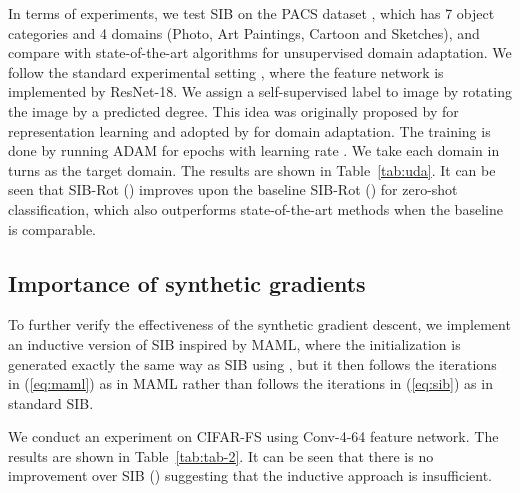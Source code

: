 \documentclass{article} \usepackage{iclr2020_conference,times}
\def\eqref#1{(\ref{#1})}
\begin{document}
In terms of experiments, we test SIB on the PACS dataset \citep{li2017deeper},
which has 7 object categories and 4 domains (Photo, Art Paintings, Cartoon and Sketches),
and compare with state-of-the-art algorithms
for unsupervised domain adaptation. 
We follow the standard experimental setting \citep{carlucci2019domain}, where 
the feature network is implemented by ResNet-18. 
We assign a self-supervised label  to image  by rotating the image
by a predicted degree. This idea was originally proposed by \citet{gidaris2018unsupervised} for representation learning
and adopted by \citet{xu2019self} for domain adaptation.
The training is done by running ADAM for  epochs with learning rate .
We take each domain in turns as the target domain. The results are shown in Table~\ref{tab:uda}.
It can be seen that SIB-Rot () improves upon the baseline SIB-Rot () for zero-shot classification,
which also outperforms state-of-the-art methods when the baseline is comparable.



\subsection{Importance of synthetic gradients}
To further verify the effectiveness of the synthetic gradient descent,
we implement an inductive version of SIB inspired by MAML,
where the initialization  is generated exactly the same way as SIB using ,
but it then follows the iterations in \eqref{eq:maml} as in MAML rather than follows the iterations in \eqref{eq:sib}
as in standard SIB.

We conduct an experiment on CIFAR-FS using Conv-4-64 feature network.
The results are shown in Table~\ref{tab:tab-2}.
It can be seen that there is no improvement over SIB () 
suggesting that the inductive approach is insufficient.
\end{document}
